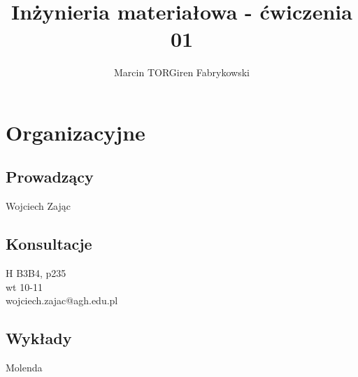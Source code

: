 \documentclass[a4paper,12pt]{article}
\title{Inżynieria materiałowa - ćwiczenia 01}
\author{Marcin TORGiren Fabrykowski}
\begin{document}
\maketitle
\newpage
\section{Organizacyjne}
\subsection{Prowadzący}
Wojciech Zając
\subsection{Konsultacje}
H B3B4, p235\\
wt 10-11\\
wojciech.zajac@agh.edu.pl
\subsection{Wykłady}
Molenda
\end{document}
